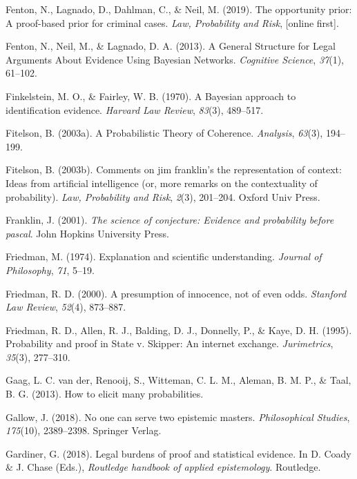 \documentclass[11pt,dvipsnames,enabledeprecatedfontcommands]{scrartcl}
\begin{document}
\hypertarget{ref-fenton2019OpportunityPriorProofbased}{}
Fenton, N., Lagnado, D., Dahlman, C., \& Neil, M. (2019). The
opportunity prior: A proof-based prior for criminal cases. \emph{Law,
Probability and Risk}, {[}online first{]}.

\hypertarget{ref-fenton2013GeneralStructureLegal}{}
Fenton, N., Neil, M., \& Lagnado, D. A. (2013). A General Structure for
Legal Arguments About Evidence Using Bayesian Networks. \emph{Cognitive
Science}, \emph{37}(1), 61--102.

\hypertarget{ref-Finkelstein1970A}{}
Finkelstein, M. O., \& Fairley, W. B. (1970). A Bayesian approach to
identification evidence. \emph{Harvard Law Review}, \emph{83}(3),
489--517.

\hypertarget{ref-fitelson2003ProbabilisticTheoryCoherence}{}
Fitelson, B. (2003a). A Probabilistic Theory of Coherence.
\emph{Analysis}, \emph{63}(3), 194--199.

\hypertarget{ref-fitelson2003comments}{}
Fitelson, B. (2003b). Comments on jim franklin's the representation of
context: Ideas from artificial intelligence (or, more remarks on the
contextuality of probability). \emph{Law, Probability and Risk},
\emph{2}(3), 201--204. Oxford Univ Press.

\hypertarget{ref-Franklin2001}{}
Franklin, J. (2001). \emph{The science of conjecture: Evidence and
probability before pascal}. John Hopkins University Press.

\hypertarget{ref-friedman1974}{}
Friedman, M. (1974). Explanation and scientific understanding.
\emph{Journal of Philosophy}, \emph{71}, 5--19.

\hypertarget{ref-Friedman2000}{}
Friedman, R. D. (2000). A presumption of innocence, not of even odds.
\emph{Stanford Law Review}, \emph{52}(4), 873--887.

\hypertarget{ref-friedmanEtAl1995}{}
Friedman, R. D., Allen, R. J., Balding, D. J., Donnelly, P., \& Kaye, D.
H. (1995). Probability and proof in State v. Skipper: An internet
exchange. \emph{Jurimetrics}, \emph{35}(3), 277--310.

\hypertarget{ref-gaag2013elicit}{}
Gaag, L. C. van der, Renooij, S., Witteman, C. L. M., Aleman, B. M. P.,
\& Taal, B. G. (2013). How to elicit many probabilities.

\hypertarget{ref-Gallow2018No}{}
Gallow, J. (2018). No one can serve two epistemic masters.
\emph{Philosophical Studies}, \emph{175}(10), 2389--2398. Springer
Verlag.

\hypertarget{ref-gardiner2018}{}
Gardiner, G. (2018). Legal burdens of proof and statistical evidence. In
D. Coady \& J. Chase (Eds.), \emph{Routledge handbook of applied
epistemology}. Routledge.
\end{document}
